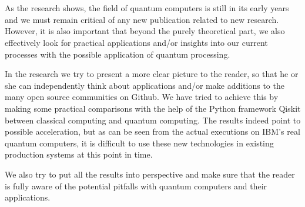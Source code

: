 
\chapter*{}

As the research shows, the field of quantum computers is still in its early years and we must remain critical of any new publication related to new research. However, it is also important that beyond the purely theoretical part, we also effectively look for practical applications and/or insights into our current processes with the possible application of quantum processing. 

In the research we try to present a more clear picture to the reader, so that he or she can independently think about applications and/or make additions to the many open source communities on Github. We have tried to achieve this by making some practical comparisons with the help of the Python framework Qiskit between classical computing and quantum computing. The results indeed point to  possible acceleration, but as can be seen from the actual executions on IBM's real quantum computers, it is difficult to use these new technologies in existing production systems at this point in time. 

We also try to put all the results into perspective and make sure that the reader is fully aware of the potential pitfalls with quantum computers and their applications. 

